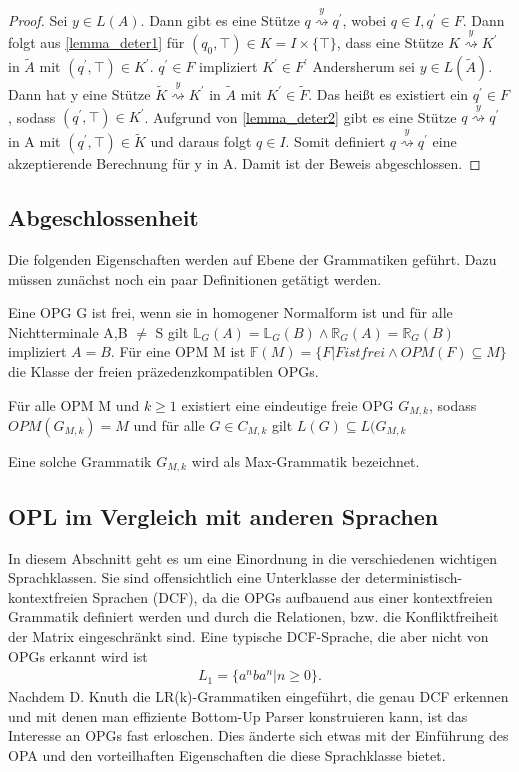 \begin{proof}
Sei $y \in L(A)$. Dann gibt es eine Stütze $q \stackrel{y} {\rightsquigarrow} q^\prime$, wobei $q\in I, q^\prime \in F$. Dann folgt aus \autoref{lemma_deter1} für $(q_0, \top) \in K=I \times \{\top\}$, dass eine Stütze $K \stackrel{y}{\rightsquigarrow}K^\prime$ in $\tilde{A}$ mit $(q^\prime, \top) \in K^\prime $. $q^\prime \in F$ impliziert $K^\prime \in F^\prime$
Andersherum sei $y \in L(\tilde{A})$. Dann hat y eine Stütze $\tilde{K}\stackrel{y}{\rightsquigarrow}K^\prime$ in $\tilde{A}$ mit $K^\prime \in \tilde{F}$. Das heißt es existiert ein $q^\prime \in F$, sodass $(q^\prime, \top) \in K^\prime$. Aufgrund von \autoref{lemma_deter2} gibt es eine Stütze $q \stackrel{y} {\rightsquigarrow} q^\prime$ in A mit $(q^\prime, \top) \in \tilde{K}$ und daraus folgt $q \in I$. Somit definiert $q\stackrel{y}{\rightsquigarrow}q^\prime$ eine akzeptierende Berechnung für y in A.
Damit ist der Beweis abgeschlossen. 
\end{proof}
\subsection{Abgeschlossenheit}
Die folgenden Eigenschaften werden auf Ebene der Grammatiken geführt. Dazu müssen zunächst noch ein paar Definitionen getätigt werden.
\begin{definition}
Eine OPG G ist frei, wenn sie in homogener Normalform ist und für alle Nichtterminale A,B $\neq$ S gilt $\mathbb{L}_G(A) = \mathbb{L}_G(B) \wedge \mathbb{R}_G(A)=\mathbb{R}_G(B)$ impliziert $A=B$. Für eine OPM M ist $\mathbb{F}(M)=\{F|F ist frei \wedge OPM(F) \subseteq M\}$ die Klasse der freien präzedenzkompatiblen OPGs.
\end{definition}

\begin{lemma}
Für alle OPM M und $k \geq 1$ existiert eine eindeutige freie OPG $G_{M,k}$, sodass $OPM(G_{M,k})=M$ und für alle $G \in C_{M,k}$ gilt $L(G)\subseteq L(G_{M,k}$
\end{lemma}
Eine solche Grammatik $G_{M,k}$ wird als Max-Grammatik bezeichnet.

\subsection{OPL im Vergleich mit anderen Sprachen}
In diesem Abschnitt geht es um eine Einordnung in die verschiedenen wichtigen Sprachklassen. Sie sind offensichtlich eine Unterklasse der deterministisch-kontextfreien Sprachen (DCF), da die OPGs aufbauend aus einer kontextfreien Grammatik definiert werden und durch die Relationen, bzw. die Konfliktfreiheit der Matrix eingeschränkt sind. Eine typische DCF-Sprache, die aber nicht von OPGs erkannt wird ist
\begin{align*}
L_1=\{a^nba^n|n \geq 0 \}.
\end{align*}
Nachdem D. Knuth die LR(k)-Grammatiken eingeführt, die genau DCF erkennen und mit denen man effiziente Bottom-Up Parser konstruieren kann, ist das Interesse an OPGs fast erloschen. Dies änderte sich etwas mit der Einführung des OPA und den vorteilhaften Eigenschaften die diese Sprachklasse bietet.
